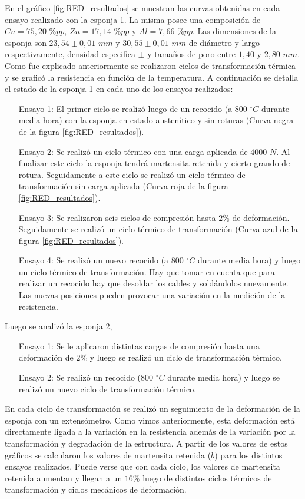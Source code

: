 \documentclass[a4paper,12pt,fleqn,twoside,openany]{book}
\begin{document}
En el gráfico \ref{fig:RED_resultados} se muestran las curvas obtenidas en cada ensayo realizado con la esponja 1. La misma posee una composición de $Cu=75,20$ $\%pp$, $Zn=17,14$ $\%pp$ y $Al=7,66$ $\%pp$. Las dimensiones de la esponja son $23,54 \pm0,01$ $mm$ y $30,55 \pm0,01$ $mm$ de diámetro y largo respectivamente, densidad especifica $ \pm $ y tamaños de poro entre $1,40$ y $2,80$ $mm$.
 Como fue explicado anteriormente se realizaron ciclos de transformación térmica y se graficó la resistencia en función de la temperatura. 
A continuación se detalla el estado de la esponja 1 en cada uno de los ensayos realizados: 
\begin{itemize}
 \item[Ensayo 1:] El primer ciclo se realizó luego de un recocido (a $800$ $^\circ C$ durante media hora) con la esponja en estado austenítico y sin roturas (Curva negra de la figura \ref{fig:RED_resultados}).
 \item[Ensayo 2:] Se realizó un ciclo térmico con una carga aplicada de $4000$ $N$. Al finalizar este ciclo la esponja tendrá martensita retenida y cierto grando de rotura. Seguidamente a este ciclo se realizó un ciclo térmico de transformación sin carga aplicada (Curva roja de la figura \ref{fig:RED_resultados}).
 \item[Ensayo 3:] Se realizaron seis ciclos de compresión hasta $2\%$ de deformación. Seguidamente se realizó un ciclo térmico de transformación (Curva azul de la figura \ref{fig:RED_resultados}).
 \item[Ensayo 4:] Se realizó un nuevo recocido (a $800$ $^\circ C$ durante media hora) y luego un ciclo térmico de transformación. Hay que tomar en cuenta que para realizar un recocido hay que desoldar los cables y soldándolos nuevamente. Las nuevas posiciones pueden provocar una variación en la medición de la resistencia.
 \end{itemize}
Luego se analizó la esponja 2, 
\begin{itemize}
 \item[Ensayo 1:] Se le aplicaron distintas cargas de compresión hasta una deformación de $2\%$ y luego se realizó un ciclo de transformación térmico.
 \item[Ensayo 2:] Se realizó un recocido ($800$ $^\circ C$ durante media hora) y luego se realizó un nuevo ciclo de transformación térmico.
\end{itemize}


En cada ciclo de transformación se realizó un seguimiento de la deformación de la esponja con un extensómetro. Como vimos anteriormente, esta deformación está directamente ligada a la variación en la resistencia además de la variación por la transformación y degradación de la estructura. A partir de los valores de estos gráficos   
se calcularon los valores de martensita retenida ($b$) para los distintos ensayos realizados. Puede verse que con cada ciclo, los valores de martensita retenida aumentan y llegan a un $16\%$ luego de distintos ciclos térmicos de transformación y ciclos mecánicos de deformación. 
\end{document}
